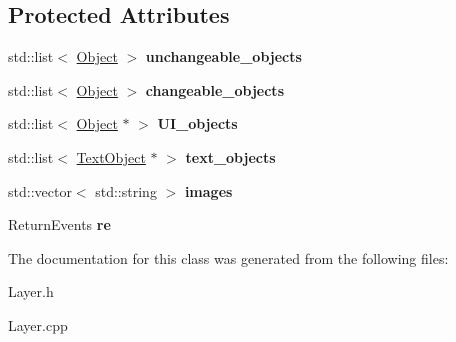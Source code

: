 \subsection*{Protected Attributes}
\begin{DoxyCompactItemize}
\item 
\mbox{\label{class_layer_ada06fdf26fe10efb2bb66ada8d10d3e0}} 
std\+::list$<$ \hyperlink{class_object}{Object} $>$ {\bfseries unchangeable\+\_\+objects}
\item 
\mbox{\label{class_layer_a6e160468d3c84bba8324a11b05be6b6e}} 
std\+::list$<$ \hyperlink{class_object}{Object} $>$ {\bfseries changeable\+\_\+objects}
\item 
\mbox{\label{class_layer_a98666cc5fd94f591c3e9ffccc02ee45c}} 
std\+::list$<$ \hyperlink{class_object}{Object} $\ast$ $>$ {\bfseries U\+I\+\_\+objects}
\item 
\mbox{\label{class_layer_a46c6bac93a96f1afc853aca03a42351a}} 
std\+::list$<$ \hyperlink{class_text_object}{Text\+Object} $\ast$ $>$ {\bfseries text\+\_\+objects}
\item 
\mbox{\label{class_layer_a0bfe2f79d24415f8619a4a7491bf1fd8}} 
std\+::vector$<$ std\+::string $>$ {\bfseries images}
\item 
\mbox{\label{class_layer_a157765c60d80f37a81c5f317da6495fe}} 
Return\+Events {\bfseries re}
\end{DoxyCompactItemize}


The documentation for this class was generated from the following files\+:\begin{DoxyCompactItemize}
\item 
Layer.\+h\item 
Layer.\+cpp\end{DoxyCompactItemize}

